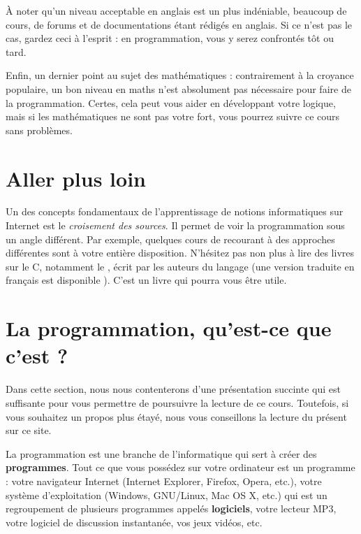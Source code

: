 À noter qu'un niveau acceptable en anglais est un plus indéniable,
beaucoup de cours, de forums et de documentations étant rédigés en
anglais. Si ce n'est pas le cas, gardez ceci à l'esprit : en
programmation, vous y serez confrontés tôt ou tard.

Enfin, un dernier point au sujet des mathématiques : contrairement à
la croyance populaire, un bon niveau en maths n'est absolument pas
nécessaire pour faire de la programmation. Certes, cela peut vous
aider en développant votre logique, mais si les mathématiques ne sont
pas votre fort, vous pourrez suivre ce cours sans problèmes.

\section{Aller plus loin}
\label{aller-plus-loin}

Un des concepts fondamentaux de l'apprentissage de notions
informatiques sur Internet est le \emph{croisement des sources}. Il
permet de voir la programmation sous un angle différent. Par exemple,
quelques cours de
recourant à des approches différentes sont à votre entière
disposition. N'hésitez pas non plus à lire des livres sur le C,
notamment le
,
écrit par les auteurs du langage (une version traduite en français est
disponible
). C'est un livre qui pourra vous être utile.

\section{La programmation, qu’est-ce que c’est ?}
\label{la-programmation-quest-ce-que-cest}

\begin{infobox}
Dans cette section, nous nous
      contenterons d'une présentation succinte qui est suffisante pour
      vous permettre de poursuivre la lecture de ce cours. Toutefois,
      si vous souhaitez un propos plus étayé, nous vous conseillons la
      lecture du
       présent sur ce site.
\end{infobox}

La programmation est une branche de l'informatique qui sert à créer
des \textbf{programmes}. Tout ce que vous possédez sur votre
ordinateur est un programme : votre navigateur Internet (Internet
Explorer, Firefox, Opera, etc.), votre système d'exploitation
(Windows, GNU/Linux, Mac OS X, etc.) qui est un regroupement de
plusieurs programmes appelés \textbf{logiciels}, votre lecteur MP3,
votre logiciel de discussion instantanée, vos jeux vidéos, etc.

